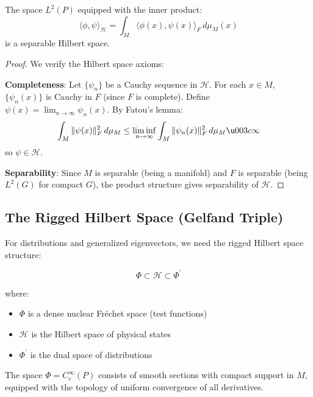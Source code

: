\begin{theorem}
The space $L^2(P)$ equipped with the inner product:
\begin{equation}
    \langle \phi, \psi \rangle_{\mathcal{H}} = \int_M \langle \phi(x), \psi(x) \rangle_F \, d\mu_M(x)
\end{equation}
is a separable Hilbert space.
\end{theorem}

\begin{proof}
We verify the Hilbert space axioms:

\textbf{Completeness}: Let $\{\psi_n\}$ be a Cauchy sequence in $\mathcal{H}$. For each $x \in M$, $\{\psi_n(x)\}$ is Cauchy in $F$ (since $F$ is complete). Define $\psi(x) = \lim_{n \to \infty} \psi_n(x)$. By Fatou's lemma:
\begin{equation}
    \int_M \|\psi(x)\|_F^2 \, d\mu_M \leq \liminf_{n \to \infty} \int_M \|\psi_n(x)\|_F^2 \, d\mu_M \u003c \infty
\end{equation}
so $\psi \in \mathcal{H}$.

\textbf{Separability}: Since $M$ is separable (being a manifold) and $F$ is separable (being $L^2(G)$ for compact $G$), the product structure gives separability of $\mathcal{H}$.
\end{proof}

\subsection{The Rigged Hilbert Space (Gelfand Triple)}

For distributions and generalized eigenvectors, we need the rigged Hilbert space structure:

\begin{equation}
    \Phi \subset \mathcal{H} \subset \Phi^\prime
\end{equation}

where:
\begin{itemize}
    \item $\Phi$ is a dense nuclear Fréchet space (test functions)
    \item $\mathcal{H}$ is the Hilbert space of physical states
    \item $\Phi^\prime$ is the dual space of distributions
\end{itemize}

\begin{definition}
The space $\Phi = C^\infty_c(P)$ consists of smooth sections with compact support in $M$, equipped with the topology of uniform convergence of all derivatives.
\end{definition}

